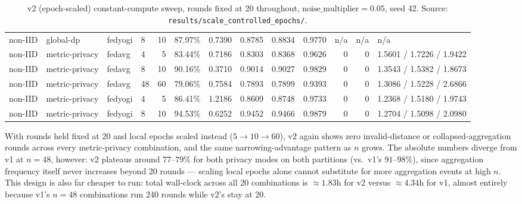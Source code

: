 \documentclass[11pt]{article}
\newcommand{\code}[1]{\texttt{#1}}
\begin{document}
\begin{table}[h]
{\begin{tabular}{llllrrrrrrrrl}
non-IID     & global-dp      & fedyogi & 8  & 10 & 87.97\% & 0.7390 & 0.8785 & 0.8834 & 0.9770 & n/a & n/a & n/a \\
non-IID     & metric-privacy & fedavg  & 4  & 5  & 83.44\% & 0.7186 & 0.8303 & 0.8368 & 0.9626 & 0 & 0 & 1.5601 / 1.7226 / 1.9422 \\
non-IID     & metric-privacy & fedavg  & 8  & 10 & 90.16\% & 0.3710 & 0.9014 & 0.9027 & 0.9829 & 0 & 0 & 1.3543 / 1.5382 / 1.8673 \\
non-IID     & metric-privacy & fedavg  & 48 & 60 & 79.06\% & 0.7584 & 0.7893 & 0.7899 & 0.9393 & 0 & 0 & 1.3086 / 1.5228 / 2.6866 \\
non-IID     & metric-privacy & fedyogi & 4  & 5  & 86.41\% & 1.2186 & 0.8609 & 0.8748 & 0.9733 & 0 & 0 & 1.2368 / 1.5180 / 1.9743 \\
non-IID     & metric-privacy & fedyogi & 8  & 10 & 94.53\% & 0.6252 & 0.9452 & 0.9466 & 0.9879 & 0 & 0 & 1.2704 / 1.5098 / 2.0980 \\
\bottomrule
\end{tabular}%
}
\caption{v2 (epoch-scaled) constant-compute sweep, rounds fixed at 20 throughout,
$\text{noise\_multiplier}=0.05$, seed 42. Source: \code{results/scale\_controlled\_epochs/}.}
\label{tab:v2}
\end{table}

\noindent
With rounds held fixed at 20 and local epochs scaled instead ($5 \to 10 \to 60$), v2 again shows
zero invalid-distance or collapsed-aggregation rounds across every metric-privacy combination, and
the same narrowing-advantage pattern as $n$ grows. The absolute numbers diverge from v1 at
$n{=}48$, however: v2 plateaus around $77$--$79\%$ for both privacy modes on both partitions
(vs.\ v1's $91$--$98\%$), since aggregation frequency itself never increases beyond 20 rounds ---
scaling local epochs alone cannot substitute for more aggregation events at high $n$. This design is
also far cheaper to run: total wall-clock across all 20 combinations is $\approx 1.83$h for v2
versus $\approx 4.34$h for v1, almost entirely because v1's $n{=}48$ combinations run 240 rounds
while v2's stay at 20.
\end{document}
